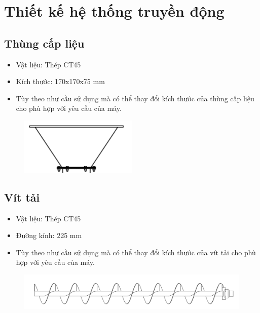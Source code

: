 \chapter{Thiết kế hệ thống truyền động}
\section{Thùng cấp liệu}
\begin{itemize}
    \item Vật liệu: Thép CT45
    \item Kích thước: 170x170x75 mm
    \item Tùy theo như cầu sử dụng mà có thể thay đổi kích thước của thùng cấp liệu cho phù hợp với yêu cầu của máy.
\end{itemize}
\begin{figure}[H]
    \centering
    \includegraphics[width=0.5\textwidth]{pictures/thungcap.png}
\end{figure}

\section{Vít tải}
\begin{itemize}
    \item Vật liệu: Thép CT45
    \item Đường kính: 225 mm
    \item Tùy theo như cầu sử dụng mà có thể thay đổi kích thước của vít tải cho phù hợp với yêu cầu của máy.
\end{itemize}
\begin{figure}[H]
    \centering
    \includegraphics[width=1\textwidth]{pictures/vit.png}
\end{figure}

